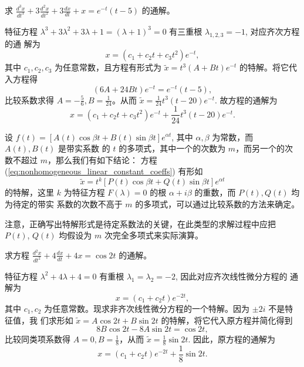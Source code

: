 \begin{example}
    求 $\frac{d^3 x}{dt^3}+3\frac{d^2 x}{dt^2}+3\frac{dx}{dt}+x=e^{-t}(t-5)$ 的通解。
\end{example}
\begin{solution}
    特征方程 $\lambda^3+3\lambda^2+3\lambda+1=(\lambda+1)^3=0$ 有三重根 $\lambda_{1,2,3}=-1$, 对应齐次方程的通
解为
$$x=(c_1+c_2t+c_3t^2)e^{-t},$$
其中 $c_1,c_2,c_3$ 为任意常数，且方程有形式为 $\tilde{x} = t^3 (A+Bt) e^{-t}$ 的特解。将它代入方程得
$$(6A+24Bt)e^{-t} = e^{-t}(t-5),$$
比较系数求得 $A=-\frac{5}{6}, B=\frac{1}{24}$。从而 $\tilde{x} = \frac{1}{24}t^3(t-20)e^{-t}$. 故方程的通解为
$$x=(c_1+c_2t+c_3t^2)e^{-t} + \frac{1}{24}t^3(t-20)e^{-t}.$$
\end{solution}

\begin{proposition}[比较系数法的类型2]\label{prop:比较系数法的类型2}
    设 $f(t) = [A(t)\cos \beta t+B(t)\sin \beta t]e^{\alpha t}$, 其中 $\alpha, \beta$ 为常数，而 $A(t), B(t)$ 是带实系数
的 $t$ 的多项式，其中一个的次数为 $m$，而另一个的次数不超过 $m$，那么我们有如下结论：
方程 (\ref{eq:nonhomogeneous_linear_constant_coeffs}) 有形如
\begin{equation}
\tilde{x} = t^k [P(t)\cos \beta t+Q(t)\sin \beta t]e^{\alpha t} \label{eq:particular_solution_trig_form}
\end{equation}
的特解，这里 $k$ 为特征方程 $F(\lambda)=0$ 的根 $\alpha+i\beta$ 的重数，而 $P(t),Q(t)$ 均为待定的带实
系数的次数不高于 $m$ 的多项式，可以通过比较系数的方法来确定。

注意，正确写出特解形式是待定系数法的关键，在此类型的求解过程中应把 $P(t)$,
$Q(t)$ 均假设为 $m$ 次完全多项式来实际演算。
\end{proposition}

\begin{example}
    求方程 $\frac{d^2 x}{dt^2}+4\frac{dx}{dt}+4x=\cos 2t$ 的通解。
\end{example}
\begin{solution}
    特征方程 $\lambda^2+4\lambda+4=0$ 有重根 $\lambda_1=\lambda_2=-2$, 因此对应齐次线性微分方程的
通解为
$$x=(c_1+c_2t)e^{-2t},$$
其中 $c_1,c_2$ 为任意常数。现求非齐次线性微分方程的一个特解。因为 $\pm 2i$ 不是特征值，我
们求形如 $\tilde{x}=A\cos 2t+B\sin 2t$ 的特解，将它代入原方程并简化得到
$$8B\cos 2t-8A\sin 2t = \cos 2t,$$
比较同类项系数得 $A=0, B=\frac{1}{8}$，从而 $\tilde{x} = \frac{1}{8}\sin 2t$. 因此，原方程的通解为
$$x=(c_1+c_2t)e^{-2t} + \frac{1}{8}\sin 2t.$$
\end{solution}

